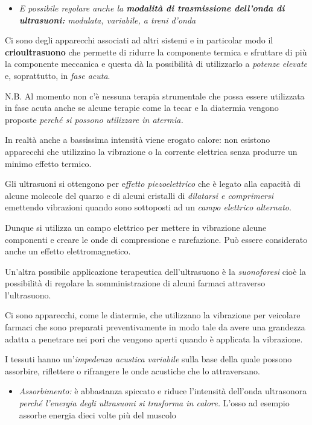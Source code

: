 \documentclass[]{article}
\begin{document}
\begin{itemize}
\item
  \emph{E possibile regolare anche la \textbf{modalità di trasmissione
  dell'onda di ultrasuoni:} modulata, variabile, a treni d'onda}
\end{itemize}

Ci sono degli apparecchi associati ad altri sistemi e in particolar modo
il \textbf{crioultrasuono} che permette di ridurre la componente termica
e sfruttare di più la componente meccanica e questa dà la possibilità di
utilizzarlo a \emph{potenze elevate} e, soprattutto, in \emph{fase
acuta}.

N.B. Al momento non c'è nessuna terapia strumentale che possa essere
utilizzata in fase acuta anche se alcune terapie come la tecar e la
diatermia vengono proposte \emph{perché si possono utilizzare in
atermia. }

In realtà anche a bassissima intensità viene erogato calore: non
esistono apparecchi che utilizzino la vibrazione o la corrente elettrica
senza produrre un minimo effetto termico.

Gli ultrasuoni si ottengono per e\emph{ffetto piezoelettrico} che è
legato alla capacità di alcune molecole del quarzo e di alcuni cristalli
di \emph{dilatarsi e comprimersi} emettendo vibrazioni quando sono
sottoposti ad un \emph{campo elettrico alternato}.

Dunque si utilizza un campo elettrico per mettere in vibrazione alcune
componenti e creare le onde di compressione e rarefazione. Può essere
considerato anche un effetto elettromagnetico.

Un'altra possibile applicazione terapeutica dell'ultrasuono è la
\emph{suonoforesi} cioè la possibilità di regolare la somministrazione
di alcuni farmaci attraverso l'ultrasuono.

Ci sono apparecchi, come le diatermie, che utilizzano la vibrazione per
veicolare farmaci che sono preparati preventivamente in modo tale da
avere una grandezza adatta a penetrare nei pori che vengono aperti
quando è applicata la vibrazione.

I tessuti hanno un'\emph{impedenza acustica variabile} sulla base della
quale possono assorbire, riflettere o rifrangere le onde acustiche che
lo attraversano.

\begin{itemize}
\item
  \emph{Assorbimento:} è abbastanza spiccato e riduce l'intensità
  dell'onda ultrasonora \emph{perché l'energia degli ultrasuoni si
  trasforma in calore.} L'osso ad esempio assorbe energia dieci volte
  più del muscolo
\end{itemize}
\end{document}
